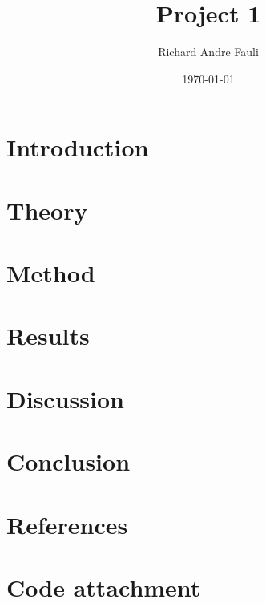 \documentclass[norsk,a4paper,12pt]{article}
\title{Project 1}
\author{Richard Andre Fauli}
\date{\today}
\begin{document}
\maketitle

\begin{abstract}
\end{abstract}

\section{Introduction}
\section{Theory}
\section{Method}
\section{Results}
\section{Discussion}
\section{Conclusion}
\section{References}
\section{Code attachment}
\end{document}
